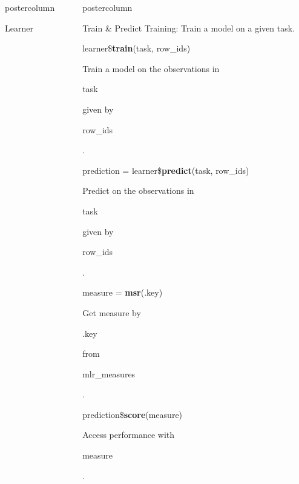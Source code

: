 \documentclass{beamer}
\newlength{\columnheight} %
\newcommand{\codeinline}[1]{\begin{codeboxinline}#1\end{codeboxinline}}
\begin{document}
\begin{frame}[fragile]{}
\begin{columns}
\begin{column}{.245\textwidth}
\begin{beamercolorbox}[center]{postercolumn}
\begin{minipage}{.98\textwidth}
{\begin{myblock}{Learner}
					\end{myblock}
					\vfill
					}
				\end{minipage}
			\end{beamercolorbox}
		\end{column}
		\begin{column}{.245\textwidth}
			\begin{beamercolorbox}[center]{postercolumn}
				\begin{minipage}{.98\textwidth}
					\parbox[t][\columnheight]{\textwidth}{
						\begin{myblock}{Train \& Predict}
						Training: Train a model on a given task.
						\vspace{1em}
						\\
						\begin{codebox}
							learner\$\textbf{train}(task, row\_ids)
						\end{codebox}
						Train a model on the observations in \codeinline{task} given by \codeinline{row\_ids}.
						\\
						\begin{codebox}
							prediction = learner\$\textbf{predict}(task, row\_ids)
						\end{codebox}
						Predict on the observations in \codeinline{task} given by \codeinline{row\_ids}.
						\\
						\vspace{1em}
						\begin{codebox}
							measure = \textbf{msr}(.key)
						\end{codebox}
						Get measure by \codeinline{.key} from \codeinline{mlr\_measures}.
						\\
						\begin{codebox}
							prediction\$\textbf{score}(measure)
						\end{codebox}
						Access performance with \codeinline{measure}.
					\end{myblock}
					\vfill
					}
				\end{minipage}
			\end{beamercolorbox}
		\end{column}
	\end{columns}
\end{frame}
\end{document}
